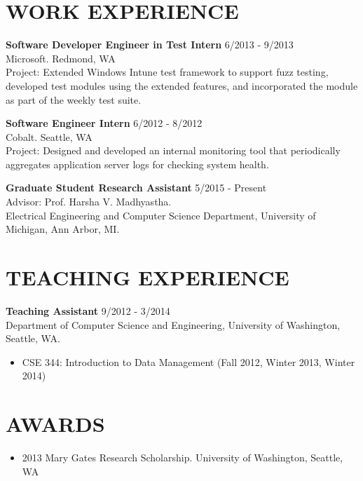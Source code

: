 \documentclass[zhemargin]{res}
\begin{document}
\begin{resume}
\section{\small WORK EXPERIENCE}
    \textbf{Software Developer Engineer in Test Intern} \hfill 6/2013 - 9/2013 \\
    Microsoft. Redmond, WA\\
    Project: Extended Windows Intune test framework to support fuzz testing, developed test modules using the extended features, and incorporated the module as part of the weekly test suite.

    \textbf{Software Engineer Intern} \hfill 6/2012 - 8/2012 \\
    Cobalt. Seattle, WA\\
    Project: Designed and developed an internal monitoring tool that periodically aggregates application server logs for checking system health.

    \textbf{Graduate Student Research Assistant} \hfill 5/2015 - Present \\
    Advisor: Prof. Harsha V. Madhyastha.\\
    Electrical Engineering and Computer Science Department, University of Michigan, Ann Arbor, MI.

\section{\small TEACHING EXPERIENCE}
	\textbf{Teaching Assistant} \hfill 9/2012 - 3/2014 \\
	Department of Computer Science and Engineering, University of Washington, Seattle, WA.
	\begin{itemize}
      \item CSE 344: Introduction to Data Management (Fall 2012, Winter 2013, Winter 2014)
	\end{itemize}

\section{\small AWARDS}
	\begin{itemize}[leftmargin=*, topsep=-10pt] %
    \item 2013 Mary Gates Research Scholarship. University of Washington, Seattle, WA
	\end{itemize}

\end{resume}
\end{document}
